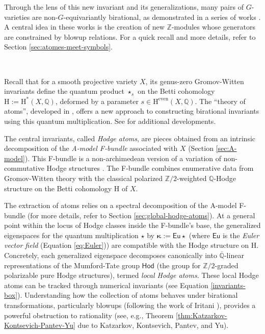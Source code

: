 \documentclass[12pt,a4paper]{amsart}
\theoremstyle{definition}
\theoremstyle{remark}
\begin{document}
Through the lens of this new invariant and its generalizations, many pairs of \( G \)-varieties are non-\( G \)-equivariantly birational, as demonstrated in a series of works \cites{Tschinkel2024, kresch2019birational, kresch2022burnside, kresch2023birational}. A central idea in these works is the creation of new \( \mathbb{Z} \)-modules whose generators are constrained by blowup relations. For a quick recall and more details, refer to Section \ref{sec:atomes-meet-symbols}.


\ 


Recall that for a smooth projective variety \(X\), its genus-zero Gromov-Witten invariants define the quantum product \(\star_s\) on the Betti cohomology \(\mathrm{H}:=\mathrm{H}^{\ast}(X, \mathbb{Q})\), deformed by a parameter \(s \in\mathrm{H}^{\text{even}}(X,\mathbb Q)\). The ``theory of atoms'', developed in \cite{katzarkovpantevyu}, offers a new approach to constructing birational invariants using this quantum multiplication. See \cites{guere2026irrationalitycubicfourfolds, benedetti2026quantumcohomologyirrationalitygushelmukai,ElaginSchneiderShinder} for additional developments.

The central invariants, called \emph{Hodge atoms}, are pieces obtained from an intrinsic decomposition of the \emph{A-model F-bundle} associated with \(X\) (Section \ref{sec:A-model}). This F-bundle is a non-archimedean version of a variation of non-commutative Hodge structures \cite{KatzarkovKontsevichPantev2008}. The F-bundle combines enumerative data from Gromov-Witten theory with the classical polarized \(\mathbb{Z}/2\)-weighted \(\mathbb{Q}\)-Hodge structure on the Betti cohomology \(\mathrm{H}\) of \(X\).

The extraction of atoms relies on a spectral decomposition of the A-model F-bundle (for more details, refer to Section \ref{sec:global-hodge-atoms}). At a general point within the locus of Hodge classes inside the F-bundle's base, the generalized eigenspaces for the quantum multiplication $\star$ by \(\boldsymbol{\kappa}:=\mathsf{Eu}\star\) (where $\mathsf{Eu}$ is the \emph{Euler vector field} (Equation \eqref{eq:Euler})) are compatible with the Hodge structure on \(\mathrm{H}\). Concretely, each generalized eigenspace decomposes canonically into \(\overline{ \mathbb{Q}}\)-linear representations of the Mumford-Tate group \(\mathsf{Hod}\) (the group for \(\mathbb{Z}/2\)-graded polarizable pure Hodge structures), termed \emph{local Hodge atoms}. These local Hodge atoms can be tracked through numerical invariants (see Equation \eqref{invariants-box}). Understanding how the collection of atoms behaves under birational transformations, particularly blowups (following the work of Iritani \cite{iritani2023quantumcohomologyblowups}), provides a powerful obstruction to rationality (see, e.g., Theorem \ref{thm:Katzarkov-Kontsevich-Pantev-Yu} due to Katzarkov, Kontsevich, Pantev, and Yu). 
\end{document}
